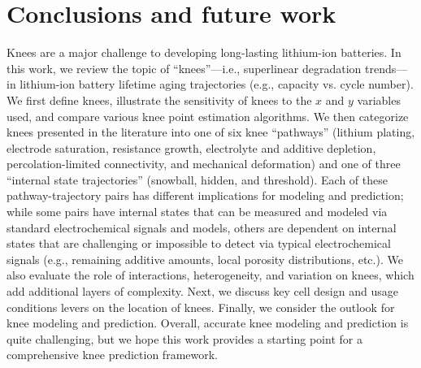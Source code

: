 \documentclass[journal=jpclcd,manuscript=article]{achemso}
\begin{document}


\newpage
\section{Conclusions and future work}

Knees are a major challenge to developing long-lasting lithium-ion batteries.
In this work, we review the topic of ``knees''---i.e., superlinear degradation trends—in lithium-ion battery lifetime aging trajectories (e.g., capacity vs. cycle number). We first define knees, illustrate the sensitivity of knees to the $x$ and $y$ variables used, and compare various knee point estimation algorithms. We then categorize knees presented in the literature into one of six knee ``pathways'' (lithium plating, electrode saturation, resistance growth, electrolyte and additive depletion, percolation-limited connectivity, and mechanical deformation) and one of three ``internal state trajectories'' (snowball, hidden, and threshold). Each of these pathway-trajectory pairs has different implications for modeling and prediction; while some pairs have internal states that can be measured and modeled via standard electrochemical signals and models, others are dependent on internal states that are challenging or impossible to detect via typical electrochemical signals (e.g., remaining additive amounts, local porosity distributions, etc.). We also evaluate the role of interactions, heterogeneity, and variation on knees, which add additional layers of complexity. Next, we discuss key cell design and usage conditions levers on the location of knees. Finally, we consider the outlook for knee modeling and prediction. Overall, accurate knee modeling and prediction is quite challenging, but we hope this work provides a starting point for a comprehensive knee prediction framework.
\end{document}

